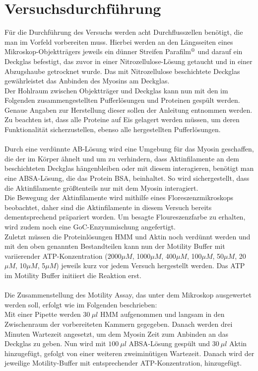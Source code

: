 \section{Versuchsdurchführung}
Für die Durchführung des Versuchs werden acht Durchflusszellen benötigt, die man im Vorfeld vorbereiten muss. Hierbei werden an den Längsseiten eines Mikroskop-Objektträgers jeweils ein dünner Streifen Parafilm$\textsuperscript{\textregistered}$ und darauf ein Deckglas befestigt, das zuvor in einer Nitrozellulose-Lösung getaucht und in einer Abzugshaube getrocknet wurde. Das mit Nitrozellulose beschichtete Deckglas gewährleistet das Anbinden des Myosins am Deckglas.\\
Der Hohlraum zwischen Objektträger und Deckglas kann nun mit den im Folgenden zusammengestellten Pufferlösungen und Proteinen gespült werden. Genaue Angaben zur Herstellung dieser sollen der Anleitung entnommen werden.\\
Zu beachten ist, dass alle Proteine auf Eis gelagert werden müssen, um deren Funktionalität sicherzustellen, ebenso alle hergestellten Pufferlösungen.\\
\\
Durch eine verdünnte AB-Lösung wird eine Umgebung für das Myosin geschaffen, die der im Körper ähnelt und um zu verhindern, dass Aktinfilamente an dem beschichteten Deckglas hängenbleiben oder mit diesem interagieren, benötigt man eine ABSA-Lösung, die das Protein BSA, beinhaltet. So wird sichergestellt, dass die Aktinfilamente größtenteils nur mit dem Myosin interagiert.\\
Die Bewegung der Aktinfilamente wird mithilfe eines Floreszenzmikroskops beobachtet, daher sind die Aktinfilamente in diesem Versuch bereits dementsprechend präpariert worden. Um besagte Floureszenzfarbe zu erhalten, wird zudem noch eine GoC-Enzymmischung angefertigt.\\
Zuletzt müssen die Proteinlösungen HMM und Aktin noch verdünnt werden und mit den oben genannten Bestandteilen kann nun der Motility Buffer mit variierender ATP-Konzentration (2000$ \mu M$, 1000$ \mu M$, 400$ \mu M$, 100$ \mu M$, 50$ \mu M$, 20$ \mu M$, 10$ \mu M$, 5$ \mu M$) jeweils kurz vor jedem Versuch hergestellt werden. Das ATP im Motility Buffer initiiert die Reaktion erst.\\
\\
Die Zusammenstellung des Motility Assay, das unter dem Mikroskop ausgewertet werden soll, erfolgt wie im Folgenden beschrieben:\\
Mit einer Pipette werden $30~ \mu l$ HMM aufgenommen und langsam in den Zwischenraum der vorbereiteten Kammern gegegeben. Danach werden drei Minuten Wartezeit angesetzt, um dem Myosin Zeit zum Anbinden an das Deckglas zu geben. Nun wird mit $100~ \mu l$ ABSA-Lösung gespült und $30~ \mu l$ Aktin hinzugefügt, gefolgt von einer weiteren zweiminütigen Wartezeit. Danach wird der jeweilige Motility-Buffer mit entsprechender ATP-Konzentration, hinzugefügt.\\
